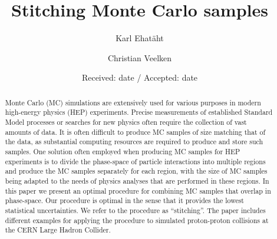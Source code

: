 \documentclass[twocolumn,epjc3]{svjour3}
\begin{document}
\title{Stitching Monte Carlo samples%
}


\author{Karl Ehat\"aht
        \and
        Christian Veelken %
}





\date{Received: date / Accepted: date}


\maketitle

\begin{abstract}
Monte Carlo (MC) simulations are extensively used for various purposes in modern high-energy physics (HEP) experiments.
Precise measurements of established Standard Model processes or searches for new physics often require the collection of vast amounts of data.
It is often difficult to produce MC samples of size matching that of the data, as substantial computing resources are required to produce and store such samples.
One solution often employed when producing MC samples for HEP experiments 
is to divide the phase-space of particle interactions into multiple regions 
and produce the MC samples separately for each region,
with the size of MC samples being adapted to the needs of physics analyses that are performed in these regions.
In this paper we present an optimal procedure for combining MC samples that overlap in phase-space.
Our procedure is optimal in the sense that it provides the lowest statistical uncertainties.
We refer to the procedure as ``stitching''.
The paper includes different examples for applying the procedure to simulated proton-proton collisions at the CERN Large Hadron Collider.
\end{abstract}
\end{document}
